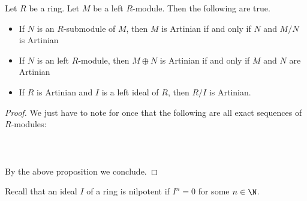 \documentclass[a4paper]{article}
\begin{document}
\begin{crl}{}{} Let $R$ be a ring. Let $M$ be a left $R$-module. Then the following are true. 
\begin{itemize}
\item If $N$ is an $R$-submodule of $M$, then $M$ is Artinian if and only if $N$ and $M/N$ is Artinian
\item If $N$ is an left $R$-module, then $M\oplus N$ is Artinian if and only if $M$ and $N$ are Artinian
\item If $R$ is Artinian and $I$ is a left ideal of $R$, then $R/I$ is Artinian. 
\end{itemize} 
\begin{proof}
We just have to note for once that the following are all exact sequences of $R$-modules: \\~\\
\\~\\
By the above proposition we conclude. 
\end{proof}
\end{crl}

Recall that an ideal $I$ of a ring is nilpotent if $I^n=0$ for some $n\in\N$. 
\end{document}
